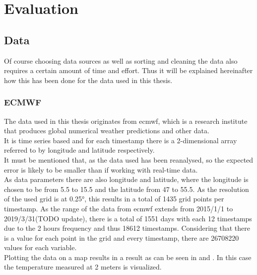 \chapter{Evaluation}
\label{ch:Evaluation}

\section{Data}
\label{sec:data}

Of course choosing data sources as well as sorting and cleaning the data also requires a certain amount of time and effort. Thus it will be explained hereinafter how this has been done for the data used in this thesis.

\subsection{ECMWF}

The data used in this thesis originates from \acrshort{ecmwf}, which is a research institute that produces global numerical weather predictions and other data.\\
It is time series based and for each timestamp there is a 2-dimensional array referred to by longitude and latitude respectively.\\

It must be mentioned that, as the data used has been reanalysed, so the expected error is likely to be smaller than if working with real-time data.\\

As data parameters there are also longitude and latitude, where the longitude is chosen to be from 5.5 to 15.5 and the latitude from 47 to 55.5. As the resolution of the used grid is at 0.25°, this results in a total of 1435 grid points per timestamp. As the range of the data from \acrshort{ecmwf} extends from 2015/1/1 to 2019/3/31(TODO update), there is a total of 1551 days with each 12 timestamps due to the 2 hours frequency and thus 18612 timestamps. Considering that there is a value for each point in the grid and every timestamp, there are 26708220 values for each variable.\\

Plotting the data on a map results in a result as can be seen in  and . In this case the temperature measured at 2 meters is visualized.\\


